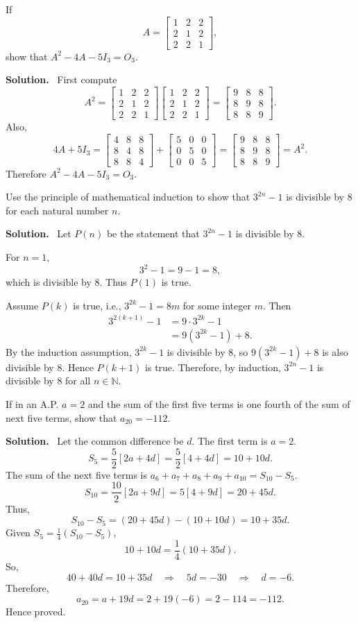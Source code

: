 \documentclass[11pt,a4paper]{article}
\newcommand{\question}[2]{\begin{tcolorbox}[breakable,colback=gray!5,colframe=black!35,title=\textbf{Question #1}]#2\end{tcolorbox}}
\newcommand{\answer}{\textbf{Solution.}\ }
\begin{document}
\question{1(b)}{If
\[
A=\begin{bmatrix}1&2&2\\2&1&2\\2&2&1\end{bmatrix},
\]
show that $A^2-4A-5I_3=O_3$.}
\answer
First compute
\[
A^2=\begin{bmatrix}1&2&2\\2&1&2\\2&2&1\end{bmatrix}
\begin{bmatrix}1&2&2\\2&1&2\\2&2&1\end{bmatrix}
=\begin{bmatrix}9&8&8\\8&9&8\\8&8&9\end{bmatrix}.
\]
Also,
\[
4A+5I_3=\begin{bmatrix}4&8&8\\8&4&8\\8&8&4\end{bmatrix}
+\begin{bmatrix}5&0&0\\0&5&0\\0&0&5\end{bmatrix}
=\begin{bmatrix}9&8&8\\8&9&8\\8&8&9\end{bmatrix}=A^2.
\]
Therefore $A^2-4A-5I_3=O_3$.

\question{1(c)}{Use the principle of mathematical induction to show that $3^{2n}-1$ is divisible by $8$ for each natural number $n$.}
\answer
Let $P(n)$ be the statement that $3^{2n}-1$ is divisible by $8$.

For $n=1$,
\[
3^{2}-1=9-1=8,
\]
which is divisible by $8$. Thus $P(1)$ is true.

Assume $P(k)$ is true, i.e., $3^{2k}-1=8m$ for some integer $m$. Then
\begin{align*}
3^{2(k+1)}-1&=9\cdot 3^{2k}-1\\
&=9(3^{2k}-1)+8.
\end{align*}
By the induction assumption, $3^{2k}-1$ is divisible by $8$, so $9(3^{2k}-1)+8$ is also divisible by $8$. Hence $P(k+1)$ is true. Therefore, by induction, $3^{2n}-1$ is divisible by $8$ for all $n\in\mathbb N$.

\question{1(d)}{If in an A.P. $a=2$ and the sum of the first five terms is one fourth of the sum of next five terms, show that $a_{20}=-112$.}
\answer
Let the common difference be $d$. The first term is $a=2$.
\[
S_5=\frac{5}{2}[2a+4d]=\frac{5}{2}[4+4d]=10+10d.
\]
The sum of the next five terms is $a_6+a_7+a_8+a_9+a_{10}=S_{10}-S_5$.
\[
S_{10}=\frac{10}{2}[2a+9d]=5[4+9d]=20+45d.
\]
Thus,
\[
S_{10}-S_5=(20+45d)-(10+10d)=10+35d.
\]
Given $S_5=\frac14(S_{10}-S_5)$,
\[
10+10d=\frac14(10+35d).
\]
So,
\[
40+40d=10+35d\quad\Rightarrow\quad 5d=-30\quad\Rightarrow\quad d=-6.
\]
Therefore,
\[
a_{20}=a+19d=2+19(-6)=2-114=-112.
\]
Hence proved.
\end{document}
